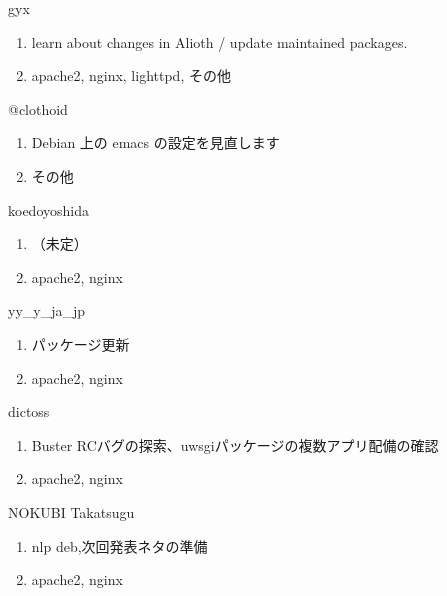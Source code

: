\begin{prework}{ gyx }
  \begin{enumerate}
  \item learn about changes in Alioth / update maintained packages.
  \item apache2, nginx, lighttpd, その他
  \end{enumerate}
\end{prework}

\begin{prework}{ @clothoid }
  \begin{enumerate}
  \item Debian 上の emacs の設定を見直します
  \item その他
  \end{enumerate}
\end{prework}

\begin{prework}{ koedoyoshida }
  \begin{enumerate}
  \item （未定）
  \item apache2, nginx
  \end{enumerate}
\end{prework}

\begin{prework}{ yy\_y\_ja\_jp }
  \begin{enumerate}
  \item パッケージ更新
  \item apache2, nginx
  \end{enumerate}
\end{prework}

\begin{prework}{ dictoss }
  \begin{enumerate}
  \item Buster RCバグの探索、uwsgiパッケージの複数アプリ配備の確認
  \item apache2, nginx
  \end{enumerate}
\end{prework}

\begin{prework}{ NOKUBI Takatsugu }
  \begin{enumerate}
  \item nlp deb,次回発表ネタの準備
  \item apache2, nginx
  \end{enumerate}
\end{prework}
